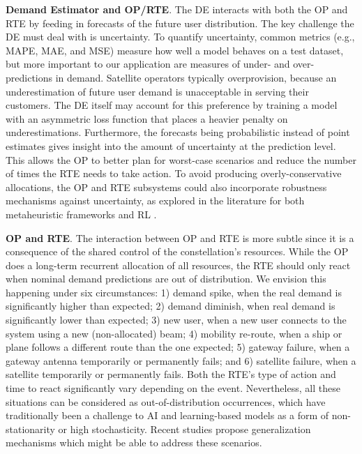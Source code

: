 \documentclass[letterpaper]{article} %
\begin{document}
\textbf{Demand Estimator and OP/RTE}. The DE interacts with both the OP and RTE by feeding in forecasts of the future user distribution. The key challenge the DE must deal with is uncertainty. To quantify uncertainty, common metrics (e.g., MAPE, MAE, and MSE) measure how well a model behaves on a test dataset, but more important to our application are measures of under- and over-predictions in demand. Satellite operators typically overprovision, because an underestimation of future user demand is unacceptable in serving their customers. The DE itself may account for this preference by training a model with an asymmetric loss function that places a heavier penalty on underestimations. Furthermore, the forecasts being probabilistic instead of point estimates gives insight into the amount of uncertainty at the prediction level. This allows the OP to better plan for worst-case scenarios and reduce the number of times the RTE needs to take action. To avoid producing overly-conservative allocations, the OP and RTE subsystems could also incorporate robustness mechanisms against uncertainty, as explored in the literature for both metaheuristic frameworks \cite{keane1995genetic, al2006incorporating} and RL \cite{bellemare2017distributional, dabney2018implicit}.



\textbf{OP and RTE}. The interaction between OP and RTE is more subtle since it is a consequence of the shared control of the constellation's resources. While the OP does a long-term recurrent allocation of all resources, the RTE should only react when nominal demand predictions are out of distribution. We envision this happening under six circumstances: 1) demand spike, when the real demand is significantly higher than expected; 2) demand diminish, when real demand is significantly lower than expected; 3) new user, when a new user connects to the system using a new (non-allocated) beam; 4) mobility re-route, when a ship or plane follows a different route than the one expected; 5) gateway failure, when a gateway antenna temporarily or permanently fails; and 6) satellite failure, when a satellite temporarily or permanently fails. Both the RTE's type of action and time to react significantly vary depending on the event. Nevertheless, all these situations can be considered as out-of-distribution occurrences, which have traditionally been a challenge to AI and learning-based models as a form of non-stationarity or high stochasticity. Recent studies \cite{Peng2018, Mankowitz2019, Ghosh2017} propose generalization mechanisms which might be able to address these scenarios.
\end{document}
